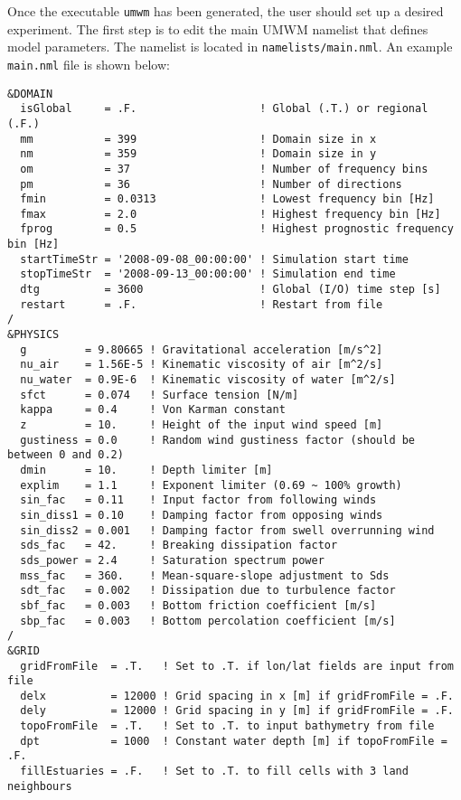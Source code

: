 \documentclass[letterpaper]{article}
\numberwithin{equation}{section}
\begin{document}
Once the executable \verb+umwm+ has been generated, 
the user should set up a desired experiment. 
The first step is to edit the main UMWM namelist that defines model parameters.
The namelist is located in \verb+namelists/main.nml+.
An example \verb+main.nml+ file is shown below:

\begin{verbatim}
&DOMAIN
  isGlobal     = .F.                   ! Global (.T.) or regional (.F.)
  mm           = 399                   ! Domain size in x
  nm           = 359                   ! Domain size in y
  om           = 37                    ! Number of frequency bins
  pm           = 36                    ! Number of directions
  fmin         = 0.0313                ! Lowest frequency bin [Hz]
  fmax         = 2.0                   ! Highest frequency bin [Hz]
  fprog        = 0.5                   ! Highest prognostic frequency bin [Hz]
  startTimeStr = '2008-09-08_00:00:00' ! Simulation start time
  stopTimeStr  = '2008-09-13_00:00:00' ! Simulation end time
  dtg          = 3600                  ! Global (I/O) time step [s]
  restart      = .F.                   ! Restart from file
/
&PHYSICS
  g         = 9.80665 ! Gravitational acceleration [m/s^2]
  nu_air    = 1.56E-5 ! Kinematic viscosity of air [m^2/s]
  nu_water  = 0.9E-6  ! Kinematic viscosity of water [m^2/s]
  sfct      = 0.074   ! Surface tension [N/m]
  kappa     = 0.4     ! Von Karman constant
  z         = 10.     ! Height of the input wind speed [m]
  gustiness = 0.0     ! Random wind gustiness factor (should be between 0 and 0.2)
  dmin      = 10.     ! Depth limiter [m]
  explim    = 1.1     ! Exponent limiter (0.69 ~ 100% growth)
  sin_fac   = 0.11    ! Input factor from following winds
  sin_diss1 = 0.10    ! Damping factor from opposing winds
  sin_diss2 = 0.001   ! Damping factor from swell overrunning wind
  sds_fac   = 42.     ! Breaking dissipation factor
  sds_power = 2.4     ! Saturation spectrum power
  mss_fac   = 360.    ! Mean-square-slope adjustment to Sds
  sdt_fac   = 0.002   ! Dissipation due to turbulence factor
  sbf_fac   = 0.003   ! Bottom friction coefficient [m/s]
  sbp_fac   = 0.003   ! Bottom percolation coefficient [m/s]
/
&GRID
  gridFromFile  = .T.   ! Set to .T. if lon/lat fields are input from file
  delx          = 12000 ! Grid spacing in x [m] if gridFromFile = .F.
  dely          = 12000 ! Grid spacing in y [m] if gridFromFile = .F.
  topoFromFile  = .T.   ! Set to .T. to input bathymetry from file
  dpt           = 1000  ! Constant water depth [m] if topoFromFile = .F.
  fillEstuaries = .F.   ! Set to .T. to fill cells with 3 land neighbours

\end{verbatim}
\end{document}
